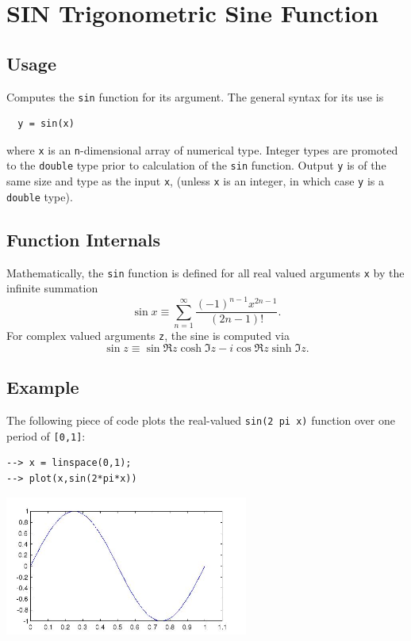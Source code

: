 \section{SIN Trigonometric Sine Function}

\subsection{Usage}

Computes the \verb|sin| function for its argument.  The general
syntax for its use is
\begin{verbatim}
  y = sin(x)
\end{verbatim}
where \verb|x| is an \verb|n|-dimensional array of numerical type.
Integer types are promoted to the \verb|double| type prior to
calculation of the \verb|sin| function.  Output \verb|y| is of the
same size and type as the input \verb|x|, (unless \verb|x| is an
integer, in which case \verb|y| is a \verb|double| type).  
\subsection{Function Internals}

Mathematically, the \verb|sin| function is defined for all real
valued arguments \verb|x| by the infinite summation
\[
  \sin x \equiv \sum_{n=1}^{\infty} \frac{(-1)^{n-1} x^{2n-1}}{(2n-1)!}.
\]
For complex valued arguments \verb|z|, the sine is computed via
\[
  \sin z \equiv \sin \Re z \cosh \Im z - i \cos \Re z
  \sinh \Im z.
\]
\subsection{Example}

The following piece of code plots the real-valued \verb|sin(2 pi x)|
function over one period of \verb|[0,1]|:
\begin{verbatim}
--> x = linspace(0,1);
--> plot(x,sin(2*pi*x))
\end{verbatim}


\centerline{\includegraphics[width=8cm]{sinplot}}

